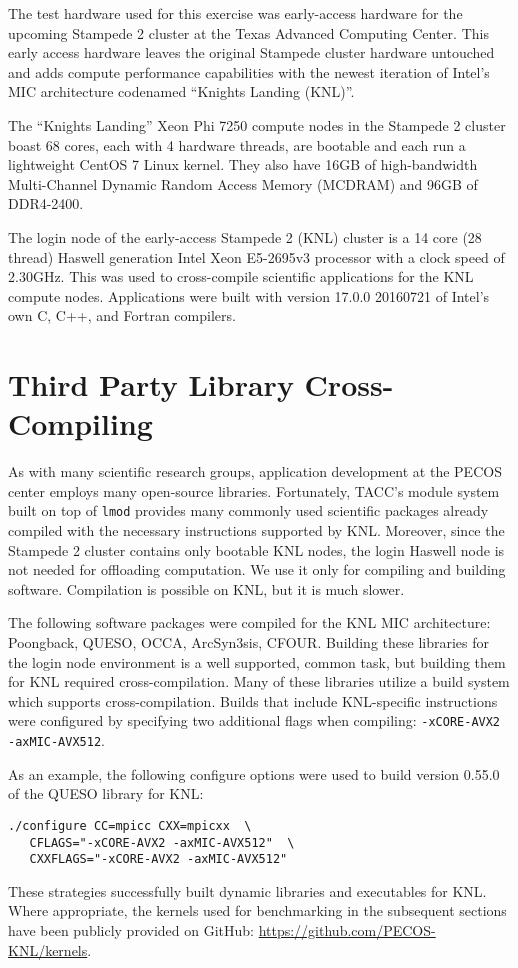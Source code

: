The test hardware used for this exercise was early-access hardware for the
upcoming Stampede 2 cluster at the Texas Advanced Computing Center.  This early
access hardware leaves
the original Stampede cluster hardware untouched and adds compute performance
capabilities with the newest iteration of Intel's MIC architecture codenamed
``Knights Landing (KNL)''.

The ``Knights Landing'' Xeon Phi 7250 compute nodes in the Stampede 2
cluster boast 68 cores, each with 4 hardware threads, are bootable and each run
a lightweight CentOS 7 Linux kernel.  They also have 16GB of high-bandwidth
Multi-Channel Dynamic Random Access Memory (MCDRAM) and 96GB of DDR4-2400.

The login node of the early-access Stampede 2 (KNL) cluster is a 14 core (28 thread)
Haswell generation Intel Xeon E5-2695v3 processor with a clock speed of
2.30GHz.  This was used to cross-compile scientific applications for the KNL
compute nodes.  Applications were built with version 17.0.0 20160721 of Intel's
own C, C++, and Fortran compilers.

\section{Third Party Library Cross-Compiling}
\label{sec:cross_compile}

As with many scientific research groups, application development at the PECOS
center employs many open-source libraries.  Fortunately, TACC's module system
built on top of \texttt{lmod} provides many commonly used scientific packages
already compiled with the necessary instructions supported by KNL.  Moreover,
since the Stampede 2 cluster contains only bootable KNL nodes, the login
Haswell node is not needed for offloading computation.  We use it only for
compiling and building software.  Compilation is possible on KNL, but it is
much slower.

The following software packages were compiled for the KNL MIC architecture:
Poongback, QUESO, OCCA, ArcSyn3sis, CFOUR.  Building these libraries
for the login node environment is a well supported, common task, but building
them for KNL required cross-compilation.  Many of these libraries utilize a
build system which supports cross-compilation.  Builds that include
KNL-specific instructions were configured by specifying two additional flags
when compiling: \texttt{-xCORE-AVX2 -axMIC-AVX512}.

As an example, the following configure options were used to build version
0.55.0 of the QUESO library for KNL:

{\small
\begin{verbatim}
./configure CC=mpicc CXX=mpicxx  \
   CFLAGS="-xCORE-AVX2 -axMIC-AVX512"  \
   CXXFLAGS="-xCORE-AVX2 -axMIC-AVX512"
\end{verbatim}
}

These strategies successfully built dynamic libraries and executables for KNL.
Where appropriate, the kernels used for benchmarking in the subsequent sections have been 
publicly provided on GitHub: \url{https://github.com/PECOS-KNL/kernels}. 
